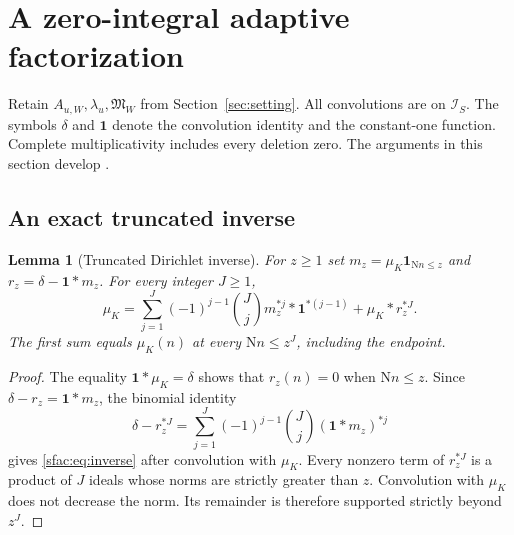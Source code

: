 \documentclass[11pt]{article}
\numberwithin{equation}{section}
\newtheorem{lemma}[theorem]{Lemma}
\theoremstyle{definition}
\theoremstyle{remark}
\newcommand{\N}{\mathrm N}
\newcommand{\Mfrak}{\mathfrak M}
\newcommand{\good}{\mathcal I_S}
\begin{document}

\section{A zero-integral adaptive factorization}
\label{sfac:sec:adaptive}\label{sec:factorization}

Retain \(A_{u,W},\lambda_u,\Mfrak_W\) from
Section~\ref{sec:setting}. All convolutions are on \(\good\).
The symbols \(\delta\) and \(\mathbf1\) denote the convolution identity
and the constant-one function. Complete multiplicativity includes
every deletion zero. The arguments in this section develop
\cite{N8,N10,N11}.

\subsection{An exact truncated inverse}

\begin{lemma}[Truncated Dirichlet inverse]
\label{sfac:lem:inverse}
For $z\ge1$ set $m_z=\mu_K\mathbf1_{\N n\le z}$ and
$r_z=\delta-\mathbf1*m_z$.  For every integer $J\ge1$,
\begin{equation}
 \mu_K=\sum_{j=1}^J(-1)^{j-1}\binom Jj
            m_z^{*j}*\mathbf1^{*(j-1)}+\mu_K*r_z^{*J}.
 \label{sfac:eq:inverse}
\end{equation}
The first sum equals $\mu_K(n)$ at every $\N n\le z^J$, including
the endpoint.
\end{lemma}

\begin{proof}
The equality $\mathbf1*\mu_K=\delta$ shows that $r_z(n)=0$ when
$\N n\le z$.  Since $\delta-r_z=\mathbf1*m_z$, the binomial identity
\[
 \delta-r_z^{*J}
  =\sum_{j=1}^J(-1)^{j-1}\binom Jj(\mathbf1*m_z)^{*j}
\]
gives \eqref{sfac:eq:inverse} after convolution with $\mu_K$.
Every nonzero term of $r_z^{*J}$ is a product of $J$ ideals whose
norms are strictly greater than $z$.  Convolution with $\mu_K$ does
not decrease the norm.  Its remainder is therefore supported strictly
beyond $z^J$.
\end{proof}
\end{document}
